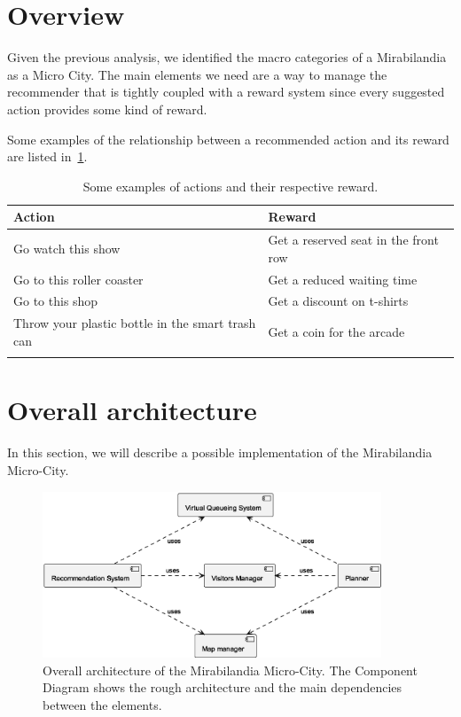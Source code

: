 \section{Overview}\label{sec:overview}
Given the previous analysis, we identified the macro categories of a Mirabilandia as a Micro City.
The main elements we need are a way to manage the recommender that is tightly coupled with a reward system since every suggested action provides some kind of reward.

Some examples of the relationship between a recommended action and its reward are listed in~\ref{tab:actions-rewards}.
\begin{longtable}{|l|l|}
	\hline
	\textbf{Action} & \textbf{Reward} \\
	\hline
	Go watch this show & Get a reserved seat in the front row \\
	\hline
	Go to this roller coaster & Get a reduced waiting time \\
	\hline
	Go to this shop & Get a discount on t-shirts \\
	\hline
	Throw your plastic bottle in the smart trash can & Get a coin for the arcade \\
	\hline 
	\caption{Some examples of actions and their respective reward.}
	\label{tab:actions-rewards}
\end{longtable}

\section{Overall architecture}\label{sec:mira-microcity}

In this section, we will describe a possible implementation of the Mirabilandia Micro-City.

\begin{figure}[H]
	\centering
	\includegraphics[width=0.9\textwidth]{img/architecture-overview.eps}
	\caption{Overall architecture of the Mirabilandia Micro-City.
		The Component Diagram shows the rough architecture and the main dependencies between the elements.
	}
	\label{fig:architecture-overview}
\end{figure}

